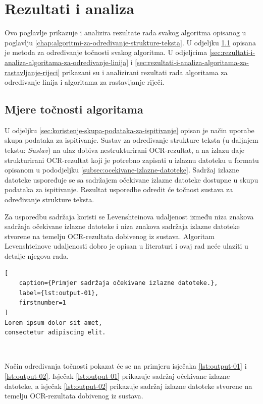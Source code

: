 \documentclass[times, utf8, zavrsni]{fer}
\begin{document}
\chapter{Rezultati i analiza}
Ovo poglavlje prikazuje i analizira rezultate rada svakog algoritma
opisanog u poglavlju \ref{chap:algoritmi-za-odredivanje-strukture-teksta}.
U odjeljku \ref{sec:mjera-tocnosti-algoritama} opisana je metoda
za određivanje točnosti svakog algoritma. U odjeljcima
\ref{sec:rezultati-i-analiza-algoritama-za-odredivanje-linija} i
\ref{sec:rezultati-i-analiza-algoritama-za-rastavljanje-rijeci}
prikazani su i analizirani rezultati rada algoritama za određivanje linija i
algoritama za rastavljanje riječi.








\section{Mjere točnosti algoritama}
\label{sec:mjera-tocnosti-algoritama}
U odjeljku \ref{sec:koristenje-skupa-podataka-za-ispitivanje} opisan je način
uporabe skupa podataka za ispitivanje. Sustav za određivanje strukture teksta
(u daljnjem tekstu: \emph{Sustav}) na ulaz dobiva nestrukturirani OCR-rezultat,
a na izlazu daje strukturirani OCR-rezultat koji je potrebno zapisati u izlaznu
datoteku u formatu opisanom u pododjeljku
\ref{subsec:ocekivane-izlazne-datoteke}. Sadržaj izlazne datoteke uspoređuje se
sa sadržajem očekivane izlazne datoteke dostupne u skupu podataka za
ispitivanje. Rezultat usporedbe odredit će točnost sustava za određivanje
strukture teksta.

Za usporedbu sadržaja koristi se Levenshteinova udaljenost između niza znakova
sadržaja očekivane izlazne datoteke i niza znakova sadržaja izlazne datoteke
stvorene na temelju OCR-rezultata dobivenog iz sustava.
Algoritam Levenshteinove udaljenosti dobro je opisan u literaturi
\citep{cormen2009introduction} i ovaj rad neće ulaziti u detalje njegova rada.

\begin{lstlisting}[
    caption={Primjer sadržaja očekivane izlazne datoteke.},
    label={lst:output-01},
    firstnumber=1
]
Lorem ipsum dolor sit amet,
consectetur adipiscing elit.
\end{lstlisting}

\

Način određivanja točnosti pokazat će se na primjeru isječaka
\ref{lst:output-01} i \ref{lst:output-02}. Isječak \ref{lst:output-01}
prikazuje sadržaj očekivane izlazne datoteke, a isječak \ref{lst:output-02}
prikazuje sadržaj izlazne datoteke stvorene na temelju OCR-rezultata dobivenog
iz sustava.
\end{document}
